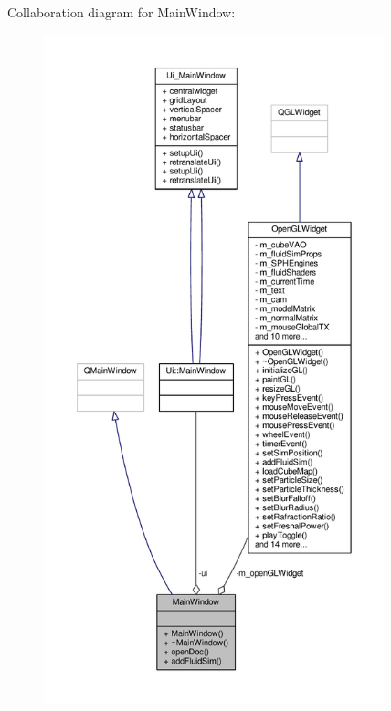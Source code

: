 Collaboration diagram for Main\-Window\-:\nopagebreak
\begin{figure}[H]
\begin{center}
\leavevmode
\includegraphics[height=550pt]{class_main_window__coll__graph}
\end{center}
\end{figure}
